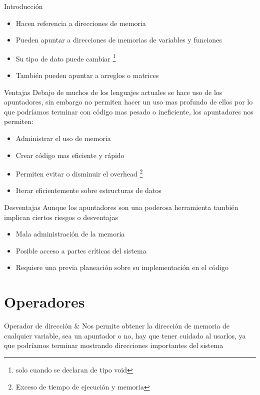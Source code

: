 \documentclass{beamer}
\begin{document}
\begin{frame}{Introducci\'on}
	\begin{itemize}
		\item Hacen referencia a direcciones de memoria
		\item Pueden apuntar a direcciones de memorias de variables y funciones
		\item Su tipo de dato puede cambiar \footnote{solo cuando se declaran de tipo void}
		\item Tambi\'en pueden apuntar a arreglos o matrices
	\end{itemize}
\end{frame}

\begin{frame}{Ventajas}
	Debajo de muchos de los lenguajes actuales se hace uso de los apuntadores, sin embargo no permiten hacer un uso mas profundo de ellos por lo que podr\'iamos terminar con c\'odigo mas pesado o ineficiente, los apuntadores nos permiten:
	\begin{itemize}
		\item Administrar el uso de memoria
		\item Crear c\'odigo mas eficiente y r\'apido
		\item Permiten evitar o disminuir el overhead \footnote{Exceso de tiempo de ejecuci\'on y memoria}
		\item Iterar eficientemente sobre estructuras de datos 
	\end{itemize}
\end{frame}

\begin{frame}{Desventajas}
	Aunque los apuntadores son una poderosa herramienta tambi\'en implican ciertos riesgos o desventajas
	\begin{itemize}
		\item Mala administraci\'on de la memoria
		\item Posible acceso a partes cr\'iticas del sistema
		\item Requiere una previa planeaci\'on sobre su implementaci\'on en el c\'odigo
	\end{itemize}
\end{frame}

\section{Operadores}
\begin{frame}{Operador de direcci\'on \&}
	Nos permite obtener la direcci\'on de memoria de cualquier variable, sea un apuntador o no, hay que tener cuidado al usarlos, ya que podr\'iamos terminar mostrando direcciones importantes del sistema
\end{frame}
\end{document}
